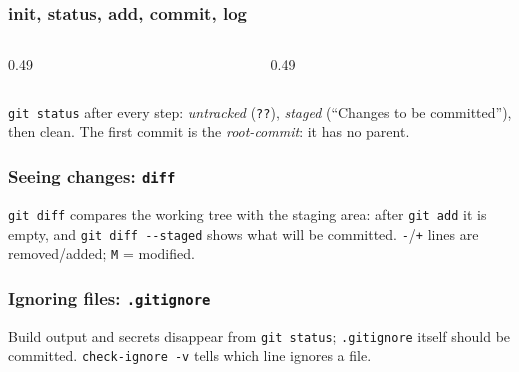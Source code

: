 \documentclass[aspectratio=169,10pt,compress]{beamer}
\begin{document}
\begin{frame}[t,fragile] \frametitle{init, status, add, commit, log}
  \begin{columns}[T]
    \begin{column}{0.49\textwidth}
    \end{column}
    \begin{column}{0.49\textwidth}
    \end{column}
  \end{columns}

  \vspace{0.1em}
  \small
  \texttt{git status} after every step: \emph{untracked} (\texttt{??}), \emph{staged} (``Changes to be committed''), then clean.
  The first commit is the \emph{root-commit}: it has no parent.
\end{frame}




\begin{frame}[t,fragile] \frametitle{Seeing changes: \texttt{diff}}

  \vspace{0.1em}
  \small
  \texttt{git diff} compares the working tree with the staging area: after \texttt{git add} it is empty, and \texttt{git diff -{}-staged} shows what will be committed.
  \texttt{-}/\texttt{+} lines are removed/added; \texttt{M} = modified.
\end{frame}




\begin{frame}[t,fragile] \frametitle{Ignoring files: \texttt{.gitignore}}

  \vspace{0.1em}
  \small
  Build output and secrets disappear from \texttt{git status}; \texttt{.gitignore} itself should be committed.
  \texttt{check-ignore -v} tells which line ignores a file.
\end{frame}

\end{document}
